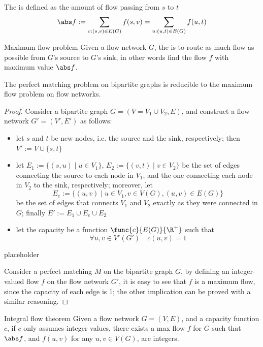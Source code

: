 \documentclass[a4paper, 12pt]{report}
\begin{document}
    The  is defined as the amount of flow passing from $s$ to $t$ $$\abs f := \sum_{v : (s, v) \in E(G)}{f(s, v)} = \sum_{u:(u, t)\in E(G)}{f(u, t)}$$

    \begin{frameddefn}{Maximum flow problem}
        Given a flow network $G$, the  is to route as much flow as possible from $G$'s source to $G$'s sink, in other words find the flow $f$ with maximum value $\abs f$.
    \end{frameddefn}

    \begin{framedthm}{}
        The perfect matching problem on bipartite graphs is reducible to the maximum flow problem on flow networks.
    \end{framedthm}

    \begin{proof}
        Consider a bipartite graph $G = (V = V_1 \cup V_2, E)$, and construct a flow network $G' = (V', E')$ as follows:

        \begin{itemize}
            \item let $s$ and $t$ be new nodes, i.e. the source and the sink, respectively; then $V' := V \cup \{s, t\}$
            \item let $E_1 := \{(s, u) \mid u \in V_1\}$, $E_2 := \{(v, t) \mid v \in V_2\}$ be the set of edges connecting the source to each node in $V_1$, and the one connecting each node in $V_2$ to the sink, respectively; moreover, let $$E_e := \{(u, v) \mid u \in V_1 , v \in V(G), (u, v) \in E(G)\}$$ be the set of edges that connects $V_1$ and $V_2$ exactly as they were connected in $G$; finally $E' := E_1 \cup E_e \cup E_2$
            \item let the capacity be a function $\func{c}{E(G)}{\R^+}$ such that $$\forall u, v \in V'(G') \quad c(u, v) = 1$$
        \end{itemize}

        placeholder 

        Consider a perfect matching $M$ on the bipartite graph $G$, by defining an integer-valued flow $f$ on the flow network $G'$, it is easy to see that $f$ is a maximum flow, since the capacity of each edge is 1; the other implication can be proved with a similar reasoning.
    \end{proof}

    \begin{framedthm}{Integral flow theorem}
        Given a flow network $G = (V, E)$, and a capacity function $c$, if $c$ only assumes integer values, there exists a max flow $f$ for $G$ such that $\abs f$, and $f(u, v)$ for any $u, v \in V(G)$, are integers.
    \end{framedthm}
\end{document}
